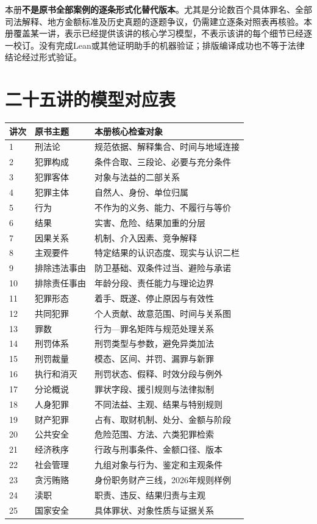 本册\textbf{不是原书全部案例的逐条形式化替代版本}。尤其是分论数百个具体罪名、全部司法解释、地方金额标准及历史真题的逐题争议，仍需建立逐条对照表再核验。本册覆盖某一讲，表示已经提供该讲的核心学习模型，不表示该讲的每个细节已经逐一校订。没有完成Lean或其他证明助手的机器验证；排版编译成功也不等于法律结论经过形式验证。

\section{二十五讲的模型对应表}
\begingroup\small\linespread{1}\selectfont
\setlength{\LTpre}{4pt}\setlength{\LTpost}{4pt}
\begin{longtable}{p{}p{}p{}}
\toprule
讲次 & 原书主题 & 本册核心检查对象\\\midrule
\endhead
1 & 刑法论 & 规范依据、解释集合、时间与地域连接\\
2 & 犯罪构成 & 条件合取、三段论、必要与充分条件\\
3 & 犯罪客体 & 对象与法益的二部关系\\
4 & 犯罪主体 & 自然人、身份、单位归属\\
5 & 行为 & 不作为的义务、能力、不履行与等价\\
6 & 结果 & 实害、危险、结果加重的分层\\
7 & 因果关系 & 机制、介入因素、竞争解释\\
8 & 主观要件 & 特定结果的认识态度、现实与认识二栏\\
9 & 排除违法事由 & 防卫基础、双条件过当、避险与承诺\\
10 & 排除责任事由 & 年龄分段、责任能力与理论边界\\
11 & 犯罪形态 & 着手、既遂、停止原因与有效性\\
12 & 共同犯罪 & 个人贡献、故意范围、时间与关系图\\
13 & 罪数 & 行为—罪名矩阵与规范处理关系\\
14 & 刑罚体系 & 刑罚类型与参数，避免异类加法\\
15 & 刑罚裁量 & 模态、区间、并罚、漏罪与新罪\\
16 & 执行和消灭 & 刑罚状态、假释、时效分段与例外\\
17 & 分论概说 & 罪状字段、援引规则与法律拟制\\
18 & 人身犯罪 & 不同法益、主观、结果与特别规则\\
19 & 财产犯罪 & 占有、取财机制、处分、金额与阶段\\
20 & 公共安全 & 危险范围、方法、六类犯罪检索\\
21 & 经济秩序 & 行政与刑事条件、金额口径、版本\\
22 & 社会管理 & 九组对象与行为、鉴定和主观条件\\
23 & 贪污贿赂 & 身份职务财产三线，2026年规则样例\\
24 & 渎职 & 职责、违反、结果归责与主观\\
25 & 国家安全 & 具体罪状、对象性质与证据关系\\\bottomrule
\end{longtable}
\endgroup

